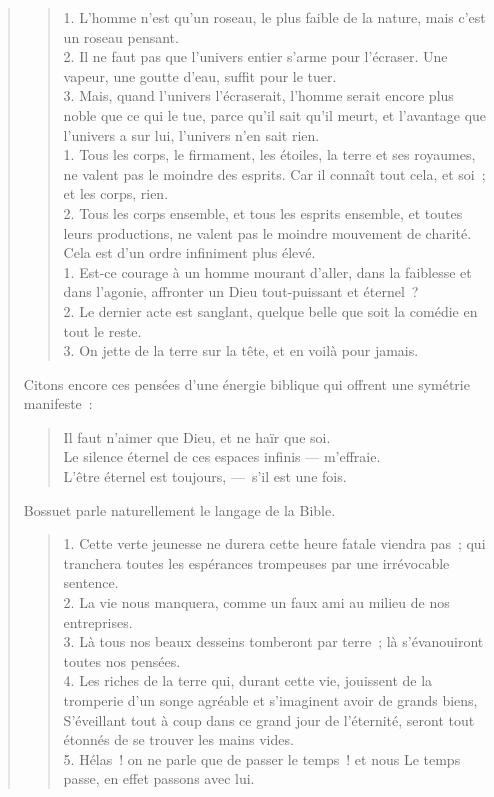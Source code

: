 \documentclass[french,twoside]{book} %
\begin{document}
\begin{verse}
\begin{verse}
1. L’homme n’est qu’un roseau, le plus faible de la nature, mais c’est un roseau pensant.\\
2. Il ne faut pas que l’univers entier s’arme pour l’écraser. Une vapeur, une goutte d’eau, suffit pour le tuer.\\
3. Mais, quand l’univers l’écraserait, l’homme serait encore plus noble que ce qui le tue, parce qu’il sait qu’il meurt, et l’avantage que l’univers a sur lui, l’univers n’en sait rien.\\
1. Tous les corps, le firmament, les étoiles, la terre et ses royaumes, ne valent pas le moindre des esprits. Car il connaît tout cela, et soi ; et les corps, rien.\\
2. Tous les corps ensemble, et tous les esprits ensemble, et toutes leurs productions, ne valent pas le moindre mouvement de charité. Cela est d’un ordre infiniment plus élevé.\\
1. Est-ce courage à un homme mourant d’aller, dans la faiblesse et dans l’agonie, affronter un Dieu tout-puissant et éternel ?\\
2. Le dernier acte est sanglant, quelque belle que soit la comédie en tout le reste.\\
3. On jette de la terre sur la tête, et en voilà pour jamais.\\
\end{verse}

\noindent Citons encore ces pensées d’une énergie biblique qui offrent une symétrie manifeste :\par


\begin{verse}
Il faut n’aimer que Dieu, et ne haïr que soi.\\
Le silence éternel de ces espaces infinis — m’effraie.\\
L’être éternel est toujours, — s’il est une fois.\\
\end{verse}

\noindent Bossuet parle naturellement le langage de la Bible.\par


\begin{verse}
1. Cette verte jeunesse ne durera cette heure fatale viendra pas ; qui tranchera toutes les espérances trompeuses par une irrévocable sentence.\\
2. La vie nous manquera, comme un faux ami au milieu de nos entreprises.\\
3. Là tous nos beaux desseins tomberont par terre ; là s’évanouiront toutes nos pensées.\\
4. Les riches de la terre qui, durant cette vie, jouissent de la tromperie d’un songe agréable et s’imaginent avoir de grands biens, S’éveillant tout à coup dans ce grand jour de l’éternité, seront tout étonnés de se trouver les mains vides.\\
5. Hélas ! on ne parle que de passer le temps ! et nous Le temps passe, en effet passons avec lui.\\
\end{verse}


\end{verse}
\end{document}
